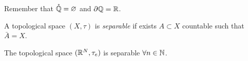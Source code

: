 Remember that $\mathring{\mathbb Q} = \varnothing$ and $\partial \mathbb Q = \mathbb R$.

\begin{defn}\label{defn-separable-space}
	A topological space $(X, \tau)$ is \emph{separable} if exists $A \subset X$ countable such that $\bar A = X$.
\end{defn}

\begin{exam}
	The topological space $(\mathbb R^N, \tau_e)$ is separable $\forall n \in \mathbb N$.
\end{exam}



